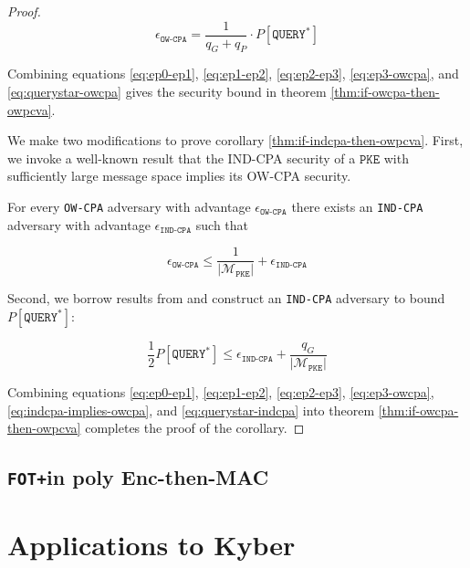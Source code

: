 \documentclass[floatrow,journal=tches,submission]{iacrtrans}
\newcommand{\monospace}{\texttt}
\newcommand{\pke}{\monospace{PKE}}
\newcommand{\norm}[1]{\left\lvert #1 \right\rvert}
\newcommand{\fotplus}{\monospace{FOT+}}
\begin{document}
\begin{proof}
    \begin{equation}\label{eq:querystar-owcpa}
        \epsilon_\monospace{OW-CPA} = \frac{1}{q_G + q_P} \cdot P[\monospace{QUERY}^\ast]
    \end{equation}

    Combining equations \ref{eq:ep0-ep1}, \ref{eq:ep1-ep2}, \ref{eq:ep2-ep3}, \ref{eq:ep3-owcpa}, and \ref{eq:querystar-owcpa} gives the security bound in theorem \ref{thm:if-owcpa-then-owpcva}.

    We make two modifications to prove corollary \ref{thm:if-indcpa-then-owpcva}. First, we invoke a well-known result that the IND-CPA security of a $\pke$ with sufficiently large message space implies its OW-CPA security.

    \begin{lemma}
        For every \monospace{OW-CPA} adversary with advantage $\epsilon_\monospace{OW-CPA}$ there exists an \monospace{IND-CPA} adversary with advantage $\epsilon_\monospace{IND-CPA}$ such that

        \begin{equation}\label{eq:indcpa-implies-owcpa}
            \epsilon_\monospace{OW-CPA} \leq \frac{1}{\norm{\mathcal{M}_\pke}} + \epsilon_\monospace{IND-CPA}
        \end{equation}
    \end{lemma}

    Second, we borrow results from \cite{hofheinz2017modular} and construct an \monospace{IND-CPA} adversary to bound $P[\monospace{QUERY}^\ast]$:

    \begin{equation}\label{eq:querystar-indcpa}
        \frac{1}{2}P[\monospace{QUERY}^\ast] 
        \leq \epsilon_\monospace{IND-CPA} + \frac{q_G}{\norm{\mathcal{M}_\pke}}
    \end{equation}

    Combining equations \ref{eq:ep0-ep1}, \ref{eq:ep1-ep2}, \ref{eq:ep2-ep3}, \ref{eq:ep3-owcpa}, \ref{eq:indcpa-implies-owcpa}, and \ref{eq:querystar-indcpa} into theorem \ref{thm:if-owcpa-then-owpcva} completes the proof of the corollary.
\end{proof}

\subsection{\fotplus in poly Enc-then-MAC}


\section{Applications to Kyber}
\end{document}
